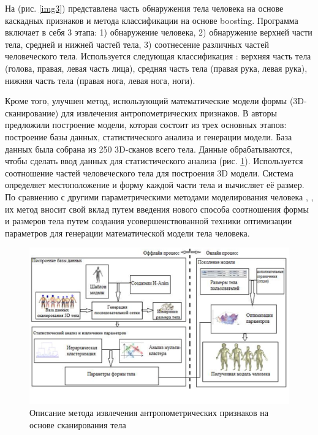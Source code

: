 На (рис. \ref{img3}) представлена часть обнаружения тела человека на основе каскадных признаков и метода классификации на основе boosting. Программа включает в себя 3 этапа: 1) обнаружение человека, 2) обнаружение верхней части тела, средней и нижней частей тела, 3) соотнесение различных частей человеческого тела. Используется следующая классификация : верхняя часть тела (голова, правая, левая часть лица), средняя часть тела (правая рука, левая рука), нижняя часть тела (правая нога, левая нога, ноги). 

Кроме того, улучшен метод, использующий математические модели формы (3D-сканирование) для извлечения антропометрических признаков. В \cite{Baek2012} авторы предложили построение модели, которая состоит из трех основных этапов: построение базы данных, статистического анализа и генерации модели. База данных была собрана из 250 3D-сканов всего тела. Данные обрабатываются, чтобы сделать ввод данных для статистического анализа (рис. \ref{img4}). Используется соотношение частей человеческого тела для построения 3D модели. Система определяет местоположение и форму каждой части тела и вычисляет её размер. По сравнению с другими параметрическими методами моделирования человека \cite{Siebert2000}, \cite{Seo2001}, их метод вносит свой вклад путем введения нового способа соотношения формы и размеров тела путем создания усовершенствованной техники оптимизации параметров для генерации математической модели тела человека.

\begin{figure}[ht!]
\centering
\includegraphics [scale=0.8] {images/h4.png}
\begin{center}
\caption{Описание метода извлечения антропометрических признаков на основе сканирования тела \cite{Baek2012}} \label{img4}
\end{center}
\end{figure}

